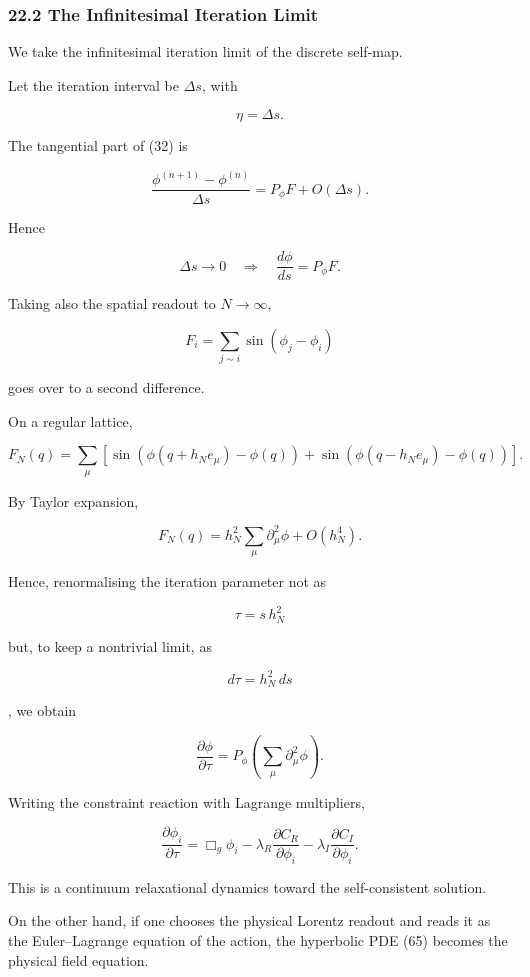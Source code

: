 \documentclass[
  a4paper,
]{article}
\begin{document}
\subsubsection{22.2 The Infinitesimal Iteration
Limit}\label{the-infinitesimal-iteration-limit}

We take the infinitesimal iteration limit of the discrete self-map.

Let the iteration interval be \(\Delta s\), with

\[
\eta=\Delta s.
\]

The tangential part of (32) is

\[
\frac{
\phi^{(n+1)}-\phi^{(n)}
}{
\Delta s
}
=
P_\phi F
+
O(\Delta s).
\]

Hence

\[
\boxed{
\Delta s\to0
\quad\Longrightarrow\quad
\frac{d\phi}{ds}
=
P_\phi F.
}
\tag{67}
\]

Taking also the spatial readout to \(N\to\infty\),

\[
F_i
=
\sum_{j\sim i}
\sin(\phi_j-\phi_i)
\]

goes over to a second difference.

On a regular lattice,

\[
F_N(q)
=
\sum_\mu
\left[
\sin(\phi(q+h_Ne_\mu)-\phi(q))
+
\sin(\phi(q-h_Ne_\mu)-\phi(q))
\right].
\tag{68}
\]

By Taylor expansion,

\[
\boxed{
F_N(q)
=
h_N^2
\sum_\mu
\partial_\mu^2\phi
+
O(h_N^4).
}
\tag{69}
\]

Hence, renormalising the iteration parameter not as

\[
\tau
=
s\,h_N^2
\]

but, to keep a nontrivial limit, as

\[
d\tau
=
h_N^2\,ds
\]

, we obtain

\[
\boxed{
\frac{\partial\phi}{\partial\tau}
=
P_\phi
\left(
\sum_\mu
\partial_\mu^2\phi
\right).
}
\tag{70}
\]

Writing the constraint reaction with Lagrange multipliers,

\[
\boxed{
\frac{\partial\phi_i}{\partial\tau}
=
\Box_g\phi_i
-
\lambda_R\frac{\partial C_R}{\partial\phi_i}
-
\lambda_I\frac{\partial C_I}{\partial\phi_i}.
}
\tag{71}
\]

This is a continuum relaxational dynamics toward the self-consistent
solution.

On the other hand, if one chooses the physical Lorentz readout and reads
it as the Euler--Lagrange equation of the action, the hyperbolic PDE
(65) becomes the physical field equation.
\end{document}

